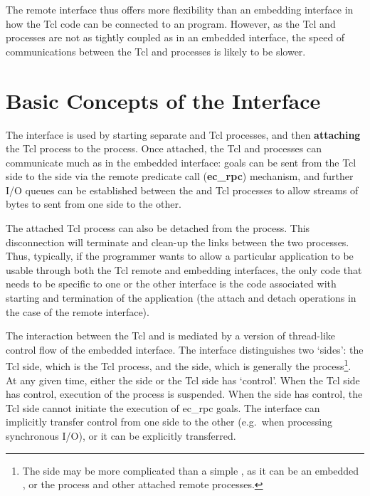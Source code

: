 The remote interface thus offers more flexibility than an embedding
interface in how the Tcl code can be connected to an {\eclipse}
program. However, as the Tcl and {\eclipse} processes are not as tightly
coupled as in an embedded interface, the speed of communications between
the Tcl and {\eclipse} processes is likely to be slower.

\section{Basic Concepts of the Interface}

The interface is used by starting separate {\eclipse} and Tcl processes, and
then {\bf attaching} the Tcl process to the {\eclipse} process. Once
attached, the Tcl and {\eclipse} processes can communicate much as in the
embedded interface: {\eclipse} goals can be sent from the Tcl side to the
{\eclipse} side via the remote predicate call ({\bf ec_rpc}) mechanism, 
and further I/O queues can be established between the {\eclipse} and Tcl
processes to allow streams of bytes to sent from one side to the other.

The attached Tcl
process can also be detached from the {\eclipse} process. This
disconnection will terminate and clean-up the links between the two
processes. Thus, typically, if the programmer wants to allow a particular
application to be usable through both the Tcl remote and embedding
interfaces, the only code that needs to be specific to one or the other
interface is the code associated with starting and termination of the
application (the attach and detach operations in the case of the remote
interface). 

The interaction between the Tcl and {\eclipse} is mediated by a version of
thread-like control flow of the embedded interface. The
interface distinguishes two `sides': the Tcl side, which is the Tcl
process, and the {\eclipse} side, which is generally the {\eclipse}
process\footnote{The {\eclipse} side may be more complicated than a simple {\eclipse}, as it can be
an embedded {\eclipse}, or the {\eclipse} process and other attached remote
processes.}. At any given time,
either the {\eclipse} side or the Tcl side has `control'. When the Tcl side
has control, execution of the {\eclipse} process is suspended. When the
{\eclipse} side has control, the Tcl side cannot initiate the execution of
ec_rpc goals. The interface can implicitly transfer control from one side
to the other (e.g.\ when processing synchronous I/O), or it can be
explicitly transferred.

